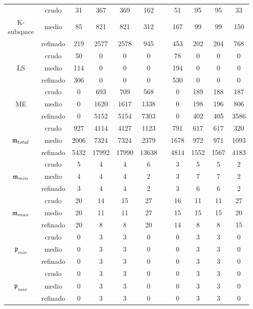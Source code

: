 \begin{table}
\begin{adjustbox}{width=0.95\columnwidth,center}
\begin{tabular}{ccccccccccc}
			& crudo & 31 & 367 & 369 & 162 &  & 51 & 95 & 95 & 33 \\
			K-subspace & medio & 85 & 821 & 821 & 312 &  & 167 & 99 & 99 & 150 \\
			& refinado & 219 & 2577 & 2578 & 945 &  & 453 & 202 & 204 & 768 \\
			\hline
			& crudo & 50 & 0 & 0 & 0 &  & 78 & 0 & 0 & 0 \\
			LS & medio & 114 & 0 & 0 & 0 &  & 194 & 0 & 0 & 0 \\
			& refinado & 306 & 0 & 0 & 0 &  & 530 & 0 & 0 & 0 \\
			\hline
			& crudo & 0 & 693 & 709 & 568 &  & 0 & 189 & 188 & 187 \\
			ME & medio & 0 & 1620 & 1617 & 1338 &  & 0 & 198 & 196 & 806 \\
			& refinado & 0 & 5152 & 5154 & 7303 &  & 0 & 402 & 405 & 3586 \\
			\hline
			& crudo & 927 & 4114 & 4127 & 1123 &  & 791 & 617 & 617 & 320 \\
			$\mathfrak{m}_{total}$ & medio & 2006 & 7324 & 7324 & 2379 &  & 1678 & 972 & 971 & 1093 \\
			& refinado & 5432 & 17992 & 17990 & 13638 &  & 4814 & 1552 & 1567 & 4183 \\
			\hline
			& crudo & 5 & 4 & 4 & 6 &  & 3 & 5 & 5 & 2 \\
			$\mathfrak{m}_{min}$ & medio & 4 & 4 & 4 & 2 &  & 3 & 7 & 7 & 2 \\
			& refinado & 3 & 4 & 4 & 2 &  & 3 & 6 & 6 & 2 \\
			\hline
			& crudo & 20 & 14 & 15 & 27 &  & 16 & 11 & 11 & 27 \\
			$\mathfrak{m}_{max}$ & medio & 20 & 11 & 11 & 27 &  & 15 & 15 & 15 & 20 \\
			& refinado & 20 & 8 & 8 & 20 &  & 14 & 8 & 8 & 15 \\
			\hline
			& crudo & 0 & 3 & 3 & 0 &  & 0 & 3 & 3 & 0 \\
			$\mathfrak{p}_{min}$ & medio & 0 & 3 & 3 & 0 &  & 0 & 3 & 3 & 0 \\
			& refinado & 0 & 3 & 3 & 0 &  & 0 & 3 & 3 & 0 \\
			\hline
			& crudo & 0 & 3 & 3 & 0 &  & 0 & 3 & 3 & 0 \\
			$\mathfrak{p}_{max}$ & medio & 0 & 3 & 3 & 0 &  & 0 & 3 & 3 & 0 \\
			& refinado & 0 & 3 & 3 & 0 &  & 0 & 3 & 3 & 0 \\
			\hline
		\end{tabular}
	\end{adjustbox}
\end{table}

